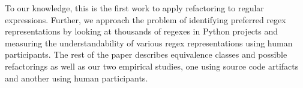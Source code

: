 To our knowledge, this is the first work to apply refactoring to regular expressions. Further, we approach the problem of identifying preferred regex representations by looking at thousands of regexes in Python projects and measuring the understandability of various regex representations using human participants. The rest of the paper describes
equivalence classes and possible refactorings as well as our two empirical studies, one using source code artifacts and another using human participants. 

%
